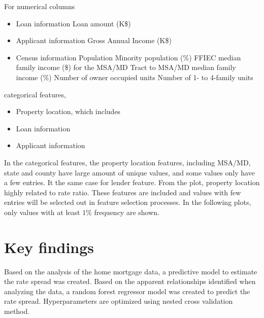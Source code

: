 \documentclass[a4paper,10pt,notitlepage]{article}
\begin{document}
For numerical columns
\begin{itemize}
\item Loan information
    \subitem Loan amount (K\$)
\item Applicant information
    \subitem Gross Annual Income (K\$)
\item Census information
    \subitem Population
    \subitem Minority population ($\%$)
    \subitem FFIEC median family income (\$) for the MSA/MD
    \subitem Tract to MSA/MD median family income ($\%$) 
    \subitem Number of owner occupied units
    \subitem Number of 1- to 4-family units
\end{itemize}

categorical features,
\begin{itemize}
\item{ Property location, which includes}
\item{ Loan information  }
\item{ Applicant information  }
\end{itemize}

In the categorical features, the property location features, including MSA/MD, state and county have large amount of unique values, and some values only have a few entries.
It the same case for lender feature. 
From the plot, property location highly related to rate ratio. These features are included and values with few entries will be selected out in feature selection processes.
In the following plots, only values with at least $1\%$ frequency are shown.


\section{Key findings}

Based on the analysis of the home mortgage data, a predictive model to estimate the rate spread was created.
Based on the apparent relationships identified when analyzing the data, a random forest regressor model was created to predict the rate spread. Hyperparameters are optimized using nested cross validation method.
\end{document}
